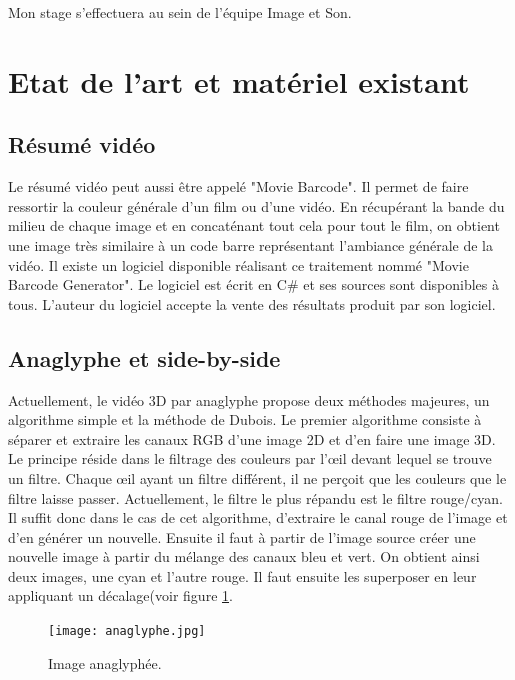 \documentclass[10pt,a4paper]{article}
\begin{document}
Mon stage s'effectuera au sein de l'équipe Image et Son.

\section{Etat de l'art et matériel existant}
\subsection{Résumé vidéo}
Le résumé vidéo peut aussi être appelé "Movie Barcode". Il permet de faire ressortir la couleur générale d'un film ou d'une vidéo. En récupérant la bande du milieu de chaque image et en concaténant tout cela pour
tout le film, on obtient une image très similaire à un code barre représentant l'ambiance générale de la vidéo.
Il existe un logiciel disponible réalisant ce traitement nommé "Movie Barcode Generator". Le logiciel est écrit en C\# et ses sources sont disponibles à tous\cite{barcode}. L'auteur du logiciel accepte la vente des
résultats produit par son logiciel.

\subsection{Anaglyphe et side-by-side}
\label{anasbs}
Actuellement, le vidéo 3D par anaglyphe propose deux méthodes majeures, un algorithme simple et la méthode de Dubois.
Le premier algorithme consiste à séparer et extraire les canaux RGB d'une image 2D et d'en faire une image 3D. Le principe réside dans le filtrage des couleurs par l'œil devant lequel se trouve un filtre.
Chaque œil ayant un filtre différent, il ne perçoit que les couleurs que le filtre laisse passer. Actuellement, le filtre le plus répandu est le filtre rouge/cyan.
Il suffit donc dans le cas de cet algorithme, d'extraire le canal rouge de l'image et d'en générer un nouvelle. Ensuite il faut à partir de l'image source créer une nouvelle image à partir du mélange des canaux bleu et vert.
On obtient ainsi deux images, une cyan et l'autre rouge. Il faut ensuite les superposer en leur appliquant un décalage(voir figure \ref{anaglyphe}.\newline

\begin{figure}[!h]
\center
\texttt{[image: anaglyphe.jpg]}
\caption{Image anaglyphée.}
\label{anaglyphe}
\end{figure}
\end{document}
